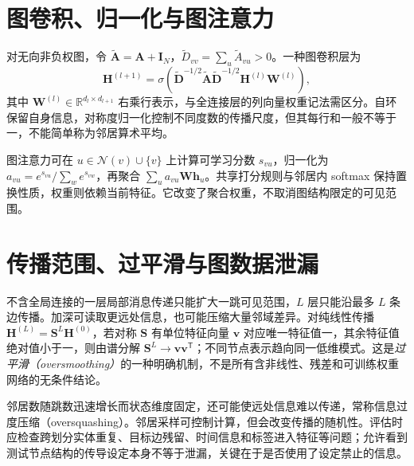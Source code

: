 \section{图卷积、归一化与图注意力}
对无向非负权图，令 $\widetilde{\mathbf A}=\mathbf A+\mathbf I_N$，$\widetilde D_{vv}=\sum_u\widetilde A_{vu}>0$。一种图卷积层\cite{kipf2016}为
\begin{equation}
\mathbf H^{(l+1)}=\sigma\!\left(\widetilde{\mathbf D}^{-1/2}\widetilde{\mathbf A}\widetilde{\mathbf D}^{-1/2}\mathbf H^{(l)}\mathbf W^{(l)}\right),
\label{eq:dl-graph-convolution}
\end{equation}
其中 $\mathbf W^{(l)}\in\mathbb R^{d_l\times d_{l+1}}$ 右乘行表示，与全连接层的列向量权重记法需区分。自环保留自身信息，对称度归一化控制不同度数的传播尺度，但其每行和一般不等于一，不能简单称为邻居算术平均。

图注意力可在 $u\in\mathcal N(v)\cup\{v\}$ 上计算可学习分数 $s_{vu}$，归一化为 $a_{vu}=e^{s_{vu}}/\sum_we^{s_{vw}}$，再聚合 $\sum_ua_{vu}\mathbf W\mathbf h_u$。共享打分规则与邻居内 softmax 保持置换性质，权重则依赖当前特征。它改变了聚合权重，不取消图结构限定的可见范围。

\section{传播范围、过平滑与图数据泄漏}
不含全局连接的一层局部消息传递只能扩大一跳可见范围，$L$ 层只能沿最多 $L$ 条边传播。加深可读取更远处信息，也可能压缩大量邻域差异。对纯线性传播 $\mathbf H^{(L)}=\mathbf S^L\mathbf H^{(0)}$，若对称 $\mathbf S$ 有单位特征向量 $\mathbf v$ 对应唯一特征值一，其余特征值绝对值小于一，则由谱分解 $\mathbf S^L\to\mathbf v\mathbf v^\mathsf T$；不同节点表示趋向同一低维模式。这是\emph{过平滑（oversmoothing）}的一种明确机制，不是所有含非线性、残差和可训练权重网络的无条件结论。

邻居数随跳数迅速增长而状态维度固定，还可能使远处信息难以传递，常称信息过度压缩（oversquashing）。邻居采样可控制计算，但会改变传播的随机性。评估时应检查跨划分实体重复、目标边残留、时间信息和标签进入特征等问题；允许看到测试节点结构的传导设定本身不等于泄漏，关键在于是否使用了设定禁止的信息。

